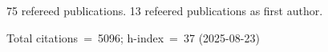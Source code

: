75 refereed publications. 13 refeered publications as first author.

Total citations~=~5096; h-index~=~37 (2025-08-23)